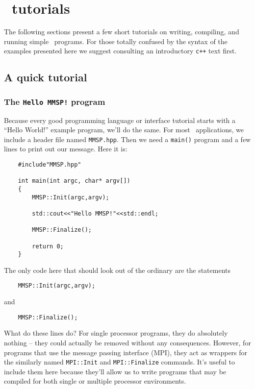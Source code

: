 
\chapter{\MMSP\ tutorials}
The following sections present a few short tutorials on writing, compiling, and running simple \MMSP\ programs.  For those totally confused by the syntax of the examples presented here we suggest consulting an introductory {\tt c++} text first.

\section{A quick tutorial}
\subsection{The {\tt Hello MMSP!} program}
Because every good programming language or interface tutorial starts with a ``Hello World!'' example program, we'll do the same.  For most \MMSP\ applications, we include a header file named {\tt MMSP.hpp}.  Then we need a {\tt main()} program and a few lines to print out our message.  Here it is:
\begin{shadebox}
\begin{verbatim}
    #include"MMSP.hpp"

    int main(int argc, char* argv[])
    {
        MMSP::Init(argc,argv);

        std::cout<<"Hello MMSP!"<<std::endl;

        MMSP::Finalize();
        
        return 0;
    }
\end{verbatim}
\end{shadebox}
The only code here that should look out of the ordinary are the statements
\begin{shadebox}
\begin{verbatim}
    MMSP::Init(argc,argv);
\end{verbatim}
\end{shadebox}
and
\begin{shadebox}
\begin{verbatim}
    MMSP::Finalize();
\end{verbatim}
\end{shadebox}
What do these lines do?  For single processor programs, they do absolutely nothing -- they could actually be removed without any consequences.  However, for programs that use the message passing interface (MPI), they act as wrappers for the similarly named {\tt MPI::Init} and {\tt MPI::Finalize} commands.  It's useful to include them here because they'll allow us to write programs that may be compiled for both single or multiple processor environments.


